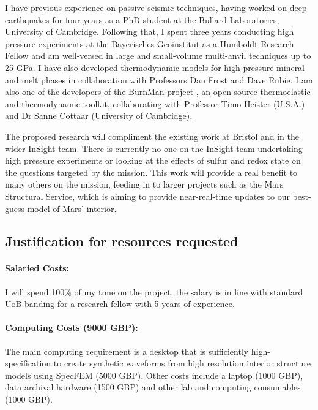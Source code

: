 \documentclass[11pt,twoside,a4paper]{article}
\begin{document}
I have previous experience on passive seismic techniques, having worked on deep earthquakes for four years as a PhD student at the Bullard Laboratories, University of Cambridge. Following that, I spent three years conducting high pressure experiments at the Bayerisches Geoinstitut as a Humboldt Research Fellow and am well-versed in large and small-volume multi-anvil techniques up to 25 GPa. I have also developed thermodynamic models for high pressure mineral and melt phases in collaboration with Professors Dan Frost and Dave Rubie. I am also one of the developers of the BurnMan project \citep{CHRU2014}, an open-source thermoelastic and thermodynamic toolkit, collaborating with Professor Timo Heister (U.S.A.) and Dr Sanne Cottaar (University of Cambridge).

The proposed research will compliment the existing work at Bristol and in the wider InSight team. There is currently no-one on the InSight team undertaking high pressure experiments or looking at the effects of sulfur and redox state on the questions targeted by the mission. This work will provide a real benefit to many others on the mission, feeding in to larger projects such as the Mars Structural Service, which is aiming to provide near-real-time updates to our best-guess model of Mars' interior.

\subsection*{Justification for resources requested}

\paragraph{Salaried Costs:} I will spend 100\% of my time on the project, the salary is in line with standard UoB banding for a research fellow with 5 years of experience.
\vspace{-1.2em}
\paragraph{Computing Costs (9000 GBP):} The main computing requirement is a desktop that is sufficiently high-specification to create synthetic waveforms from high resolution interior structure models using SpecFEM (5000 GBP). Other costs include a laptop (1000 GBP), data archival hardware (1500 GBP) and other lab and computing consumables (1000 GBP).
\vspace{-1.2em}
\end{document}
